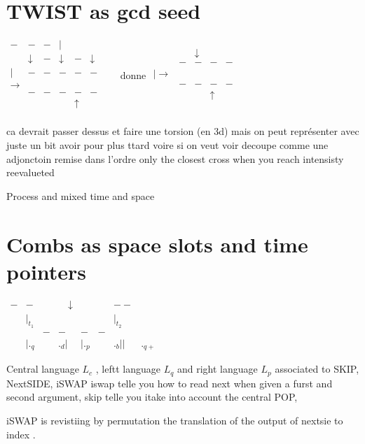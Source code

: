\documentclass{article}
\begin{document}
\section{TWIST as gcd seed}
$
\begin{matrix}
-&-&-&|&&\\
&\downarrow&-&\downarrow&-&\downarrow&&\\
  |                &-&-&-&- &-  \\
 \longrightarrow                  &&&&&\\
                   &-&-&-&-&-  \\
&&&&\uparrow&&\\                
\end{matrix}
$
donne 
$
\begin{matrix}
&&\downarrow&&\\
                  &-&-&-&- \\
| \longrightarrow                  &&&&\\
                   &-&-&-&- \\
&&&\uparrow&&\\                
\end{matrix}
$


ca devrait passer dessus et faire une torsion (en 3d)  mais on peut représenter avec juste un bit  avoir pour plus ttard voire si on veut voir  decoupe comme  une adjonctoin  remise dans l'ordre
 only the closest cross when you reach intensisty reevalueted

Process and mixed time and space 
\section{Combs as space slots and time pointers}
$
\begin{matrix}
-&-&&\quad \downarrow&&&--\\
&|_{t_1}&&&&&|_{t_2}&\\
&&-&-&-&-&&\\
&|._q &&._d|&|._p&&._b||&._{q+}
\end{matrix}
$

Central language $L_c$ , leftt language $L_q$ and right language $L_p$
associated to SKIP, NextSIDE, iSWAP iswap telle you how to read next  when given a furst and second argument, skip telle you itake into account the central POP, 

iSWAP is revistiing by permutation the translation of the output of nextsie to index .
\end{document}
